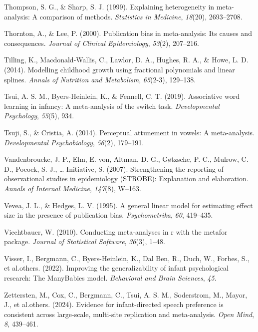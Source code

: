 \documentclass[
  man]{apa6}
\newlength{\cslhangindent}
\newlength{\cslentryspacingunit} %
\newenvironment{CSLReferences}[2] %
 {%
  \setlength{\parindent}{0pt}
  \ifodd #1
  \let\oldpar\par
  \def\par{\hangindent=\cslhangindent\oldpar}
  \fi
  \setlength{\parskip}{#2\cslentryspacingunit}
 }%
 {}
\begin{document}
\begin{CSLReferences}{1}{0}
\leavevmode{}%
Thompson, S. G., \& Sharp, S. J. (1999). Explaining heterogeneity in meta-analysis: A comparison of methods. \emph{Statistics in Medicine}, \emph{18}(20), 2693--2708.

\leavevmode{}%
Thornton, A., \& Lee, P. (2000). Publication bias in meta-analysis: Its causes and consequences. \emph{Journal of Clinical Epidemiology}, \emph{53}(2), 207--216.

\leavevmode{}%
Tilling, K., Macdonald-Wallis, C., Lawlor, D. A., Hughes, R. A., \& Howe, L. D. (2014). Modelling childhood growth using fractional polynomials and linear splines. \emph{Annals of Nutrition and Metabolism}, \emph{65}(2-3), 129--138.

\leavevmode{}%
Tsui, A. S. M., Byers-Heinlein, K., \& Fennell, C. T. (2019). Associative word learning in infancy: A meta-analysis of the switch task. \emph{Developmental Psychology}, \emph{55}(5), 934.

\leavevmode{}%
Tsuji, S., \& Cristia, A. (2014). Perceptual attunement in vowels: A meta-analysis. \emph{Developmental Psychobiology}, \emph{56}(2), 179--191.

\leavevmode{}%
Vandenbroucke, J. P., Elm, E. von, Altman, D. G., Gøtzsche, P. C., Mulrow, C. D., Pocock, S. J., \ldots{} Initiative, S. (2007). Strengthening the reporting of observational studies in epidemiology (STROBE): Explanation and elaboration. \emph{Annals of Internal Medicine}, \emph{147}(8), W--163.

\leavevmode{}%
Vevea, J. L., \& Hedges, L. V. (1995). A general linear model for estimating effect size in the presence of publication bias. \emph{Psychometrika}, \emph{60}, 419--435.

\leavevmode{}%
Viechtbauer, W. (2010). Conducting meta-analyses in r with the metafor package. \emph{Journal of Statistical Software}, \emph{36}(3), 1--48.

\leavevmode{}%
Visser, I., Bergmann, C., Byers-Heinlein, K., Dal Ben, R., Duch, W., Forbes, S., et al.others. (2022). Improving the generalizability of infant psychological research: The ManyBabies model. \emph{Behavioral and Brain Sciences}, \emph{45}.

\leavevmode{}%
Zettersten, M., Cox, C., Bergmann, C., Tsui, A. S. M., Soderstrom, M., Mayor, J., et al.others. (2024). Evidence for infant-directed speech preference is consistent across large-scale, multi-site replication and meta-analysis. \emph{Open Mind}, \emph{8}, 439--461.

\end{CSLReferences}
\end{document}
